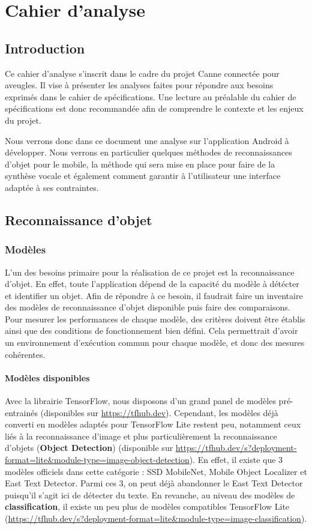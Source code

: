 \documentclass[UTF8]{EPURapport}
\begin{document}
\chapter{Cahier d'analyse}

\section{Introduction}
Ce cahier d'analyse s'inscrit dans le cadre du projet Canne connectée pour aveugles. Il vise à présenter les analyses faites pour répondre aux besoins exprimés dans le cahier de spécifications. Une lecture au préalable du cahier de spécifications est donc recommandée afin de comprendre le contexte et les enjeux du projet.

Nous verrons donc dans ce document une analyse sur l'application Android à développer. Nous verrons en particulier quelques méthodes de reconnaissances d'objet pour le mobile, la méthode qui sera mise en place pour faire de la synthèse vocale et également comment garantir à l'utilisateur une interface adaptée à ses contraintes.

\section{Reconnaissance d'objet}
\subsection{Modèles}
L'un des besoins primaire pour la réalisation de ce projet est la reconnaissance d'objet. En effet, toute l’application dépend de la capacité du modèle à détécter et identifier un objet. Afin de répondre à ce besoin, il faudrait faire un inventaire des modèles de reconnaissance d'objet disponible puis faire des comparaisons. Pour mesurer les performances de chaque modèle, des critères doivent être établis ainsi que des conditions de fonctionnement bien défini. Cela permettrait d'avoir un environnement d'exécution commun pour chaque modèle, et donc des mesures cohérentes.

\subsubsection{Modèles disponibles}
Avec la librairie TensorFlow, nous disposons d'un grand panel de modèles pré-entrainés (disponibles sur \url{https://tfhub.dev}). Cependant, les modèles déjà converti en modèles adaptés pour TensorFlow Lite restent peu, notamment ceux liés à la reconnaissance d'image et plus particulièrement la reconnaissance d'objets (\textbf{Object Detection}) (disponible sur \url{https://tfhub.dev/s?deployment-format=lite&module-type=image-object-detection}). En effet, il existe que 3 modèles officiels dans cette catégorie : SSD MobileNet, Mobile Object Localizer et East Text Detector. Parmi ces 3, on peut déjà abandonner le East Text Detector puisqu'il s'agit ici de détecter du texte. En revanche, au niveau des modèles de \textbf{classification}, il existe un peu plus de modèles compatibles TensorFlow Lite (\url{https://tfhub.dev/s?deployment-format=lite&module-type=image-classification}).
\end{document}
